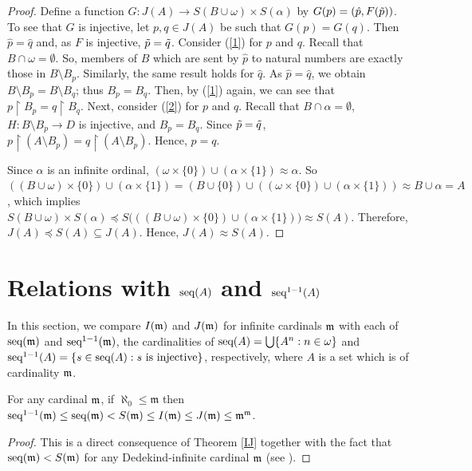 \begin{proof}
    Define a function $G:J(A)\to S(B\cup\omega) \times S(\alpha)$ by $G(p)=(\hat{p},F(\Tilde{p}))$. To see that $G$ is injective, let $p,q\in J(A)$ be such that $G(p)=G(q)$. Then $\hat{p}=\hat{q}$ and, as $F$ is injective, $\Tilde{p}=\Tilde{q}$. Consider (\ref{1}) for $p$ and $q$. Recall that $B\cap\omega=\emptyset$. So, members of $B$ which are sent by $\hat{p}$ to natural numbers are exactly those in $B\setminus B_{p}$. Similarly, the same result holds for $\hat{q}$. As $\hat{p}=\hat{q}$, we obtain $B\setminus B_{p}=B\setminus B_{q}$; thus $B_{p}=B_{q}$. Then, by (\ref{1}) again, we can see that $p\restriction B_{p}=q\restriction B_{q}$. Next, consider (\ref{2}) for $p$ and $q$. Recall that $B\cap\alpha=\emptyset$, $H:B\setminus B_{p}\to D$ is injective, and $B_{p}=B_{q}$. Since $\Tilde{p}=\Tilde{q}$, $p\restriction (A\setminus B_{p})=q\restriction (A\setminus B_{p})$. Hence, $p=q$.

Since $\alpha$ is an infinite ordinal, $(\omega\times\{0\}) \cup (\alpha\times\{1\}) \approx \alpha$. So $((B\cup\omega)\times\{0\})\cup (\alpha\times\{1\}) = (B\cup\{0\}) \cup ((\omega\times\{0\}) \cup (\alpha\times\{1\})) \approx B \cup \alpha = A$, which implies $S(B\cup\omega) \times S(\alpha) \preceq S\bigl(((B\cup\omega)\times\{0\})\cup (\alpha\times\{1\})\bigr)\approx S(A)$. Therefore, $J(A)\preceq S(A)\subseteq J(A)$. Hence, $J(A)\approx S(A)$.
\end{proof}




\section{Relations with $\seq(A)$ and $\seq^{1-1}(A)$}

In this section, we compare $I(\frak{m})$ and $J(\frak{m})$ for infinite cardinals $\frak{m}$ with each of $\seq(\frak{m})$ and $\seq^{1-1}(\frak{m})$, the cardinalities of $\seq(A) = \bigcup \{A^n : n\in\omega\}$ and $\seq^{1-1}(A) = \{ s\in\seq(A) : s\text{\ is injective}\}$, respectively, where $A$ is a set which is of cardinality $\frak{m}$.




\begin{theorem}\label{all}
For any cardinal $\frak{m}$, if $\aleph_{0} \leq \mathfrak{m}$ then $\seq^{1-1}(\mathfrak{m})\leq \seq(\mathfrak{m})<S(\mathfrak{m}) \leq I(\mathfrak{m}) \leq J(\mathfrak{m}) \leq \mathfrak{m}^{\mathfrak{m}}$.
\end{theorem}

\begin{proof}
This is a direct consequence of Theorem \ref{IJ} together with the fact that $\seq(\frak{m})<S(\frak{m})$ for any Dedekind-infinite cardinal $\frak{m}$ (see \cite[Theorem 2.1]{SonVej2019}).
\end{proof}


